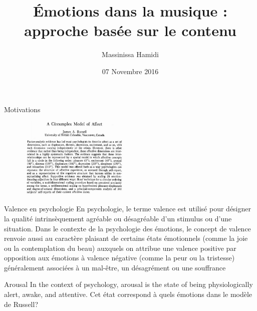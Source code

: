 \documentclass{beamer}
\title[]{Émotions dans la musique :\\approche basée sur le contenu}
\author{Massinissa Hamidi}
\institute{Université Paris Diderot - Paris 7}
\date{07 Novembre 2016}
\begin{document}
\begin{frame} %
 \titlepage
\end{frame} %

\begin{frame}{Motivations}
\end{frame}

\begin{frame}{}
\begin{figure}
\centering
\includegraphics[width=200px]{images/a_circumplex_model_of_affect.png}
\end{figure}
\end{frame}
\begin{frame}{Valence en psychologie}
En psychologie, le terme valence est utilisé pour désigner la qualité
intrinsèquement agréable ou désagréable d'un stimulus ou d'une situation. Dans
le contexte de la psychologie des émotions, le concept de valence renvoie
aussi au caractère plaisant de certains états émotionnels (comme la joie ou la
contemplation du beau) auxquels on attribue une valence positive par
opposition aux émotions à valence négative (comme la peur ou la tristesse)
généralement associées à un mal-être, un désagrément ou une souffrance
\end{frame}

\begin{frame}{Arousal}
In the context of psychology, arousal is the state of being physiologically
alert, awake, and attentive.
Cet état correspond à quels émotions dans le modèle de Russell?
\end{frame}
\end{document}
